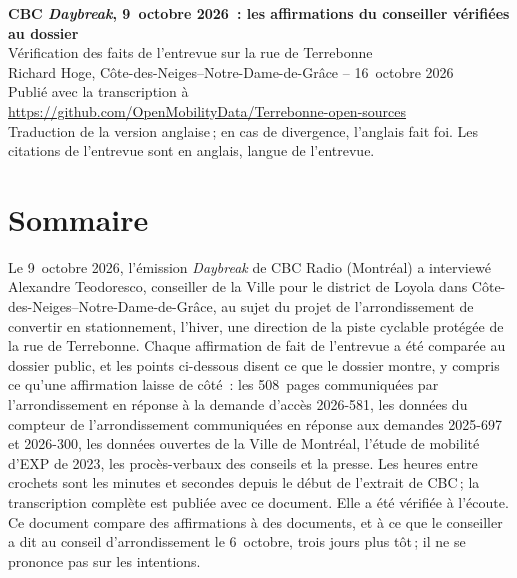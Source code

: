 \documentclass[11pt,letterpaper]{article}
\newcommand{\repourl}{https://github.com/OpenMobilityData/Terrebonne-open-sources}
\newcommand{\repo}[1]{\href{\repourl}{#1}}
\begin{document}
\begin{center}
{\Large\bfseries CBC \emph{Daybreak}, 9~octobre 2026~: les affirmations du conseiller vérifiées au dossier}\\[0.4em]
{\large Vérification des faits de l'entrevue sur la rue de Terrebonne}\\[0.6em]
Richard Hoge, Côte-des-Neiges--Notre-Dame-de-Grâce -- 16~octobre 2026\\
Publié avec la transcription à \repo{\repourl}\\
{\small Traduction de la version anglaise\,; en cas de divergence, l'anglais fait foi. Les citations de l'entrevue sont en anglais, langue de l'entrevue.}
\end{center}

\section*{Sommaire}

Le 9~octobre 2026, l'émission \emph{Daybreak} de CBC Radio (Montréal) a
interviewé Alexandre Teodoresco, conseiller de la Ville pour le district de
Loyola dans Côte-des-Neiges--Notre-Dame-de-Grâce, au sujet du projet de
l'arrondissement de convertir en stationnement, l'hiver, une direction de la
piste cyclable protégée de la rue de Terrebonne. Chaque affirmation de fait
de l'entrevue a été comparée au dossier public, et les points ci-dessous
disent ce que le dossier montre, y compris ce qu'une affirmation laisse de
côté~: les 508~pages communiquées
par l'arrondissement en réponse à la demande d'accès 2026-581, les données
du compteur de l'arrondissement communiquées en réponse aux demandes
2025-697 et 2026-300, les données ouvertes de la Ville de Montréal, l'étude
de mobilité d'EXP de 2023, les procès-verbaux des conseils et la presse. Les
heures entre crochets sont les minutes et secondes depuis le début de
l'extrait de CBC\,; la transcription complète est publiée avec ce document.
Elle a été vérifiée à l'écoute. Ce document compare des affirmations à des documents,
et à ce que le conseiller a dit au conseil d'arrondissement le 6~octobre,
trois jours plus tôt\,; il ne se prononce pas sur les intentions.
\end{document}
